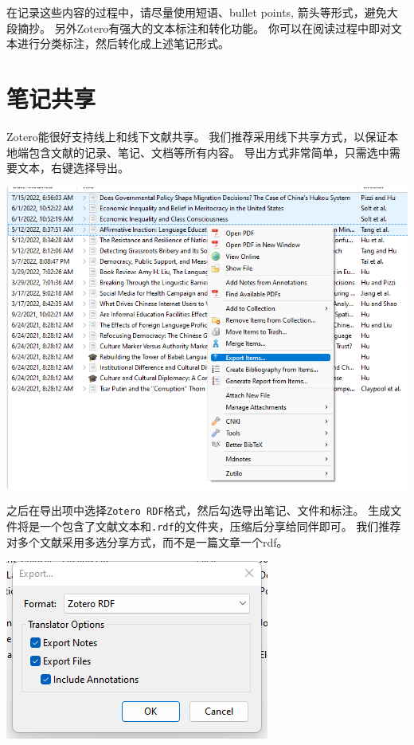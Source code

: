 \documentclass[
  letterpaper,
  DIV=11,
  numbers=noendperiod,
  oneside]{scrreprt}
\begin{document}
在记录这些内容的过程中，请尽量使用短语、bullet points,
箭头等形式，避免大段摘抄。 另外Zotero有强大的文本标注和转化功能。
你可以在阅读过程中即对文本进行分类标注，然后转化成上述笔记形式。

\hypertarget{ux7b14ux8bb0ux5171ux4eab}{%
\section{笔记共享}\label{ux7b14ux8bb0ux5171ux4eab}}

Zotero能很好支持线上和线下文献共享。
我们推荐采用线下共享方式，以保证本地端包含文献的记录、笔记、文档等所有内容。
导出方式非常简单，只需选中需要文本，右键选择导出。

\includegraphics{./images/lit_export.png}

之后在导出项中选择\texttt{Zotero\ RDF}格式，然后勾选导出笔记、文件和标注。
生成文件将是一个包含了文献文本和\texttt{.rdf}的文件夹，压缩后分享给同伴即可。
我们推荐对多个文献采用多选分享方式，而不是一篇文章一个rdf。

\includegraphics{./images/lit_export_set.png}
\end{document}
